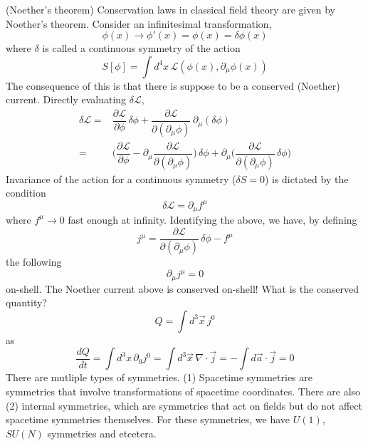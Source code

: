 \vspace{2ex}
\begin{thm}
(Noether's theorem) Conservation laws in classical field theory are given by Noether's theorem. Consider an infinitesimal transformation,
\[\phi (x)\rightarrow \phi '(x)=\phi (x)=\delta \phi (x)\]
where $\delta $ is called a continuous symmetry of the action
\[S[\phi ]=\int d^{4}x\,\mathcal{L}(\phi (x),\partial _{\mu }\phi (x))\]
The consequence of this is that there is suppose to be a conserved (Noether) current. Directly evaluating $\delta \mathcal{L}$,
\[\begin{align*}
	\delta \mathcal{L}=&\dfrac{\partial \mathcal{L}}{\partial \phi }\,\delta \phi +\dfrac{\partial \mathcal{L}}{\partial (\partial _{\mu }\phi )}  \,\partial_{\mu }(\delta \phi )\\
=&\Big(\dfrac{\partial \mathcal{L}}{\partial \phi }-\partial _{\mu }\dfrac{\partial \mathcal{L}}{\partial (\partial _{\mu }\phi )}  \Big)\,\delta \phi +\partial _{\mu }\Big(\dfrac{\partial \mathcal{L}}{\partial (\partial _{\mu }\phi )} \,\delta \phi \Big)
\end{align*}\]
Invariance of the action for a continuous symmetry ($\delta S=0$) is dictated by the condition \[\delta \mathcal{L}=\partial _{\mu }f^{\mu }\]
where $f^{\mu }\rightarrow 0$ fast enough at infinity. Identifying the above, we have, by defining
\[j^{\mu }=\dfrac{\partial \mathcal{L}}{\partial (\partial _{\mu }\phi )}\,\delta \phi -f^{\mu } \]
the following
\[\partial _{\mu }j^{\mu }=0\]
on-shell. The Noether current above is conserved on-shell! What is the conserved quantity?
\[Q=\int d^3\vec{x}\,j^{0}\]
as
\[\dfrac{d Q}{d t}=\int d^3x\,\partial _{0}j^{0}=\int d^3\vec{x}\,\nabla \cdot \vec{j}=-\int d\vec{a}\cdot \vec{j}=0 \]
There are mutliple types of symmetries. (1) Spacetime symmetries are symmetries that involve transformations of spacetime coordinates. There are also (2) internal symmetries, which are symmetries that act on fields but do not affect spacetime symmetries themselves. For these symmetries, we have $U(1)$, $SU(N)$ symmetries and etcetera.

\end{thm}
\vspace{2ex}


